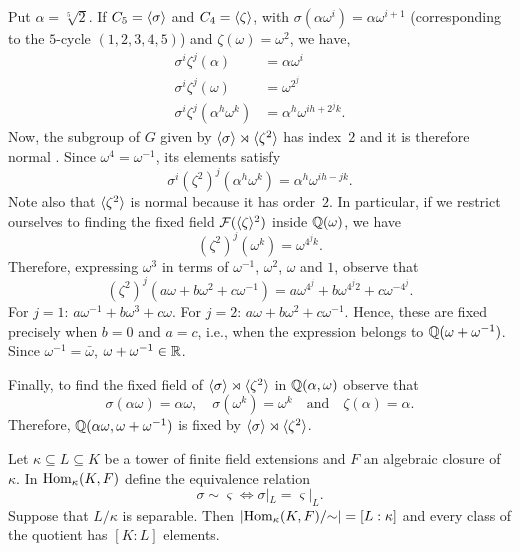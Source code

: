 \begin{solution}
\begin{enumerate}[a), font=\upshape]
        Put $\alpha=\sqrt[5]2$. If $C_5=\langle\sigma\rangle$ and $C_4=\langle\zeta\rangle$, with $\sigma(\alpha\omega^i)=\alpha\omega^{i+1}$ (corresponding to the $5$-cycle $(1,2,3,4,5)$) and $\zeta(\omega)=\omega^2$, we have,
        \begin{align*}
            \sigma^i\zeta^j(\alpha) &= \alpha\omega^i\\
            \sigma^i\zeta^j(\omega) &= \omega^{2^j}\\
            \sigma^i\zeta^j(\alpha^h\omega^k)
                &= \alpha^h\omega^{ih+2^jk}.
        \end{align*}
        Now, the subgroup of $G$ given by $\langle\sigma\rangle\rtimes\langle\zeta^2\rangle$ has index~$2$ and it is therefore normal \citep{LC}. Since $\omega^4=\omega^{-1}$, its elements satisfy
        $$
            \sigma^i(\zeta^2)^j(\alpha^h\omega^k)
                = \alpha^h\omega^{ih-jk}.
        $$
        Note also that $\langle\zeta^2\rangle$ is normal because it has order~$2$. In particular, if we restrict ourselves to finding the fixed field $\mathcal F(\langle\zeta\rangle^2)$ inside $\mathbb{Q}(\omega)$, we have 
        $$
            (\zeta^2)^j(\omega^k)=\omega^{4^jk}.
        $$
        Therefore, expressing $\omega^3$ in terms of $\omega^{-1}$, $\omega^2$, $\omega$ and $1$, observe that
        $$
            (\zeta^2)^j(a\omega+b\omega^2+c\omega^{-1})
                = a\omega^{4^j}+b\omega^{4^j2}+c\omega^{-4^j}.
        $$
        For $j=1$: $a\omega^{-1}+b\omega^3+c\omega$. For $j=2$: $a\omega+b\omega^2+c\omega^{-1}$. Hence, these are fixed precisely when $b=0$ and $a=c$, i.e., when the expression belongs to $\mathbb{Q}(\omega+\omega^{-1})$. Since $\omega^{-1}=\bar\omega$, $\omega+\omega^{-1}\in\mathbb{R}$.
        
        Finally, to find the fixed field of $\langle\sigma\rangle\rtimes\langle\zeta^2\rangle$ in $\mathbb{Q}(\alpha,\omega)$ observe that
        $$
            \sigma(\alpha\omega)=\alpha\omega,\quad
            \sigma(\omega^k)=\omega^k
            \quad\text{and}\quad
            \zeta(\alpha)=\alpha.
        $$
        Therefore, $\mathbb{Q}(\alpha\omega,\omega+\omega^{-1})$ is fixed by $\langle\sigma\rangle\rtimes\langle\zeta^2\rangle$. \qedhere
    \end{enumerate}
\end{solution}

\begin{probl}
    Let\/ $\kappa\subseteq L\subseteq K$ be a tower of finite field extensions and\/ $F$ an algebraic closure of\/ $\kappa$. In\/ ${\rm Hom}_\kappa(K,F)$ define the equivalence relation
    $$
        \sigma\sim\varsigma\iff\sigma|_L=\varsigma|_L.
    $$
    Suppose that $L/\kappa$ is separable. Then\/ $|{\rm Hom}_\kappa(K,F)/{\sim}|=[L:\kappa]$ and every class of the quotient has\/ $[K:L]$ elements.
\end{probl}

